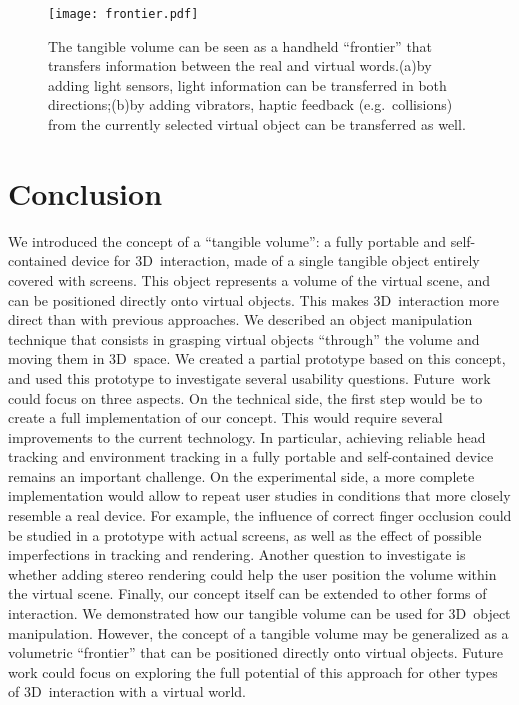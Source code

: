 \documentclass{vgtc}                         \havecopyrightspacefalse
\begin{document}
\begin{figure}[t!]
  \centering
  \texttt{[image: frontier.pdf]}
  \caption{The tangible volume can be seen as a handheld ``frontier'' that transfers information between the real and virtual
    words.\enskip (a)\;by adding light sensors, light information can be transferred in both directions;\enskip (b)\;by adding vibrators, haptic feedback (e.g.~collisions) from the currently selected virtual object can be transferred as well.}
  \label{fig:frontier}
\end{figure}

\section{Conclusion}

We introduced the concept of a ``tangible volume'': a fully portable and self-contained device for 3D~interaction, made of a single tangible object entirely covered with screens. This object represents a volume of the virtual scene, and can be positioned directly onto virtual objects. This makes 3D~interaction more direct than with previous approaches. We described an object manipulation technique that consists in grasping virtual objects ``through'' the volume and moving them in 3D~space. We created a partial prototype based on this concept, and used this prototype to investigate several usability questions. \mbox{Future work} could focus on three aspects. On the technical side, the first step would be to create a full implementation of our concept. This would require several improvements to the current technology. In particular, achieving reliable head tracking and environment tracking in a fully portable and self-contained device remains an important challenge. On the experimental side, a more complete implementation would allow to repeat user studies in conditions that more closely resemble a real device. For example, the influence of correct finger occlusion could be studied in a prototype with actual screens, as well as the effect of possible imperfections in tracking and rendering. Another question to investigate is whether adding stereo rendering could help the user position the volume within the virtual scene. Finally, our concept itself can be extended to other forms of interaction. We demonstrated how our tangible volume can be used for 3D~object manipulation. However, the concept of a tangible volume may be generalized as a volumetric ``frontier'' that can be positioned directly onto virtual objects. Future work could focus on exploring the full potential of this approach for other types of 3D~interaction with a virtual world.





\end{document}
